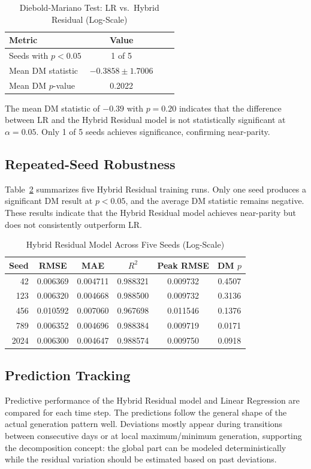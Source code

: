 \documentclass{ieeeaccess}
\begin{document}
\begin{table}[!t]
\caption{Diebold-Mariano Test: LR vs.\ Hybrid Residual (Log-Scale)}
\label{tab:dm_test}
\centering
\begin{tabular}{lccc}
\toprule
Metric & Value & & \\
\midrule
Seeds with $p<0.05$ & 1 of 5 & & \\
Mean DM statistic & $-0.3858 \pm 1.7006$ & & \\
Mean DM $p$-value & 0.2022 & & \\
\bottomrule
\end{tabular}
\end{table}

The mean DM statistic of $-0.39$ with $p=0.20$ indicates that the difference between LR and the Hybrid Residual model is not statistically significant at $\alpha=0.05$. Only 1 of 5 seeds achieves significance, confirming near-parity.

\subsection{Repeated-Seed Robustness}
Table~\ref{tab:seed_results} summarizes five Hybrid Residual training runs. Only one seed produces a significant DM result at $p<0.05$, and the average DM statistic remains negative. These results indicate that the Hybrid Residual model achieves near-parity but does not consistently outperform LR.

\begin{table}[!t]
\caption{Hybrid Residual Model Across Five Seeds (Log-Scale)}
\label{tab:seed_results}
\centering
\begin{tabular}{rccccc}
\toprule
Seed & RMSE & MAE & $R^2$ & Peak RMSE & DM $p$ \\
\midrule
42 & 0.006369 & 0.004711 & 0.988321 & 0.009732 & 0.4507 \\
123 & 0.006320 & 0.004668 & 0.988500 & 0.009732 & 0.3136 \\
456 & 0.010592 & 0.007060 & 0.967698 & 0.011546 & 0.1376 \\
789 & 0.006352 & 0.004696 & 0.988384 & 0.009719 & 0.0171 \\
2024 & 0.006300 & 0.004647 & 0.988574 & 0.009750 & 0.0918 \\
\bottomrule
\end{tabular}
\end{table}

\subsection{Prediction Tracking}
Predictive performance of the Hybrid Residual model and Linear Regression are compared for each time step. The predictions follow the general shape of the actual generation pattern well. Deviations mostly appear during transitions between consecutive days or at local maximum/minimum generation, supporting the decomposition concept: the global part can be modeled deterministically while the residual variation should be estimated based on past deviations.
\end{document}
